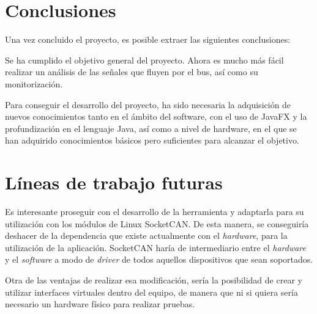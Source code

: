 
\section{Conclusiones}\label{conclusiones}

Una vez concluido el proyecto, es posible extraer las siguientes conclusiones:

Se ha cumplido el objetivo general del proyecto. Ahora es mucho más fácil realizar un análisis de las señales que fluyen por el bus, así como su monitorización.

Para conseguir el desarrollo del proyecto, ha sido necesaria la adquisición de nuevos conocimientos tanto en el ámbito del software, con el uso de JavaFX y la profundización en el lenguaje Java, así como a nivel de hardware, en el que se han adquirido conocimientos básicos pero suficientes para alcanzar el objetivo.



\section{Líneas de trabajo futuras}\label{lineas_de_trabajo_futuras}

Es interesante proseguir con el desarrollo de la herramienta y adaptarla para su utilización con los módulos de Linux SocketCAN.
De esta manera, se conseguiría deshacer de la dependencia que existe actualmente con el \emph{hardware}, para la utilización de la aplicación. SocketCAN haría de intermediario entre el \emph{hardware} y el \emph{software} a modo de \emph{driver} de todos aquellos dispositivos que sean soportados.

Otra de las ventajas de realizar esa modificación, sería la posibilidad de crear y utilizar interfaces virtuales dentro del equipo, de manera que ni si quiera sería necesario un hardware físico para realizar pruebas.
